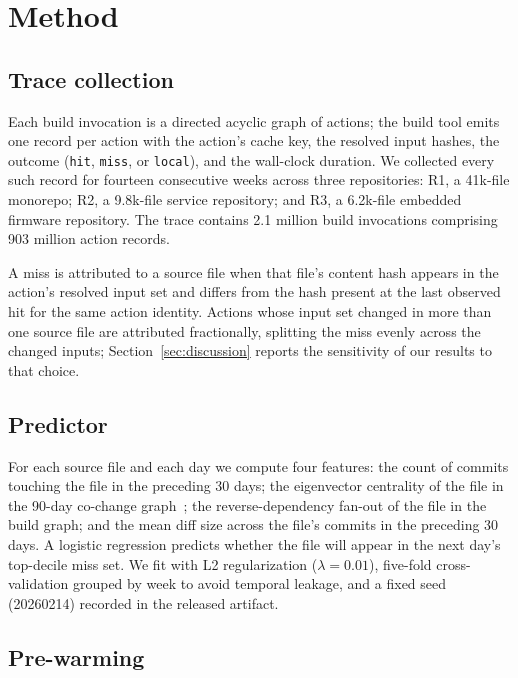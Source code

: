 \documentclass{anvil-paper}
\begin{document}
\section{Method}
\label{sec:method}

\subsection{Trace collection}

Each build invocation is a directed acyclic graph of actions; the build tool
emits one record per action with the action's cache key, the resolved input
hashes, the outcome (\texttt{hit}, \texttt{miss}, or \texttt{local}), and the
wall-clock duration. We collected every such record for fourteen consecutive
weeks across three repositories: R1, a 41k-file monorepo; R2, a 9.8k-file
service repository; and R3, a 6.2k-file embedded firmware repository. The
trace contains 2.1 million build invocations comprising 903 million action
records.

A miss is attributed to a source file when that file's content hash appears in
the action's resolved input set and differs from the hash present at the last
observed hit for the same action identity. Actions whose input set changed in
more than one source file are attributed fractionally, splitting the miss
evenly across the changed inputs; Section~\ref{sec:discussion} reports the
sensitivity of our results to that choice.

\subsection{Predictor}

For each source file and each day we compute four features: the count of
commits touching the file in the preceding 30 days; the eigenvector centrality
of the file in the 90-day co-change graph~\cite{imani2017graphcentrality};
the reverse-dependency fan-out of the file in the build graph; and the mean
diff size across the file's commits in the preceding 30 days. A logistic
regression predicts whether the file will appear in the next day's
top-decile miss set. We fit with L2 regularization ($\lambda = 0.01$), five-fold
cross-validation grouped by week to avoid temporal leakage, and a fixed seed
(20260214) recorded in the released artifact.

\subsection{Pre-warming}
\end{document}
